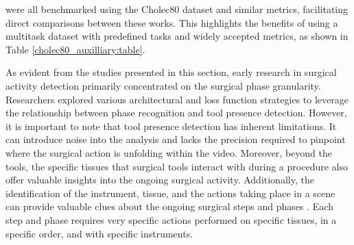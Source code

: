 \documentclass[times,twocolumn,final]{elsarticle}
\begin{document}
\citet{EndoNet,multi_task_recurrent_conv,multitask_connectionism,tecno,Sanchez-Matilla2022_data_centric} were all benchmarked using the Cholec80 dataset and similar metrics, facilitating direct comparisons between these works. This highlights the benefits of using a multitask dataset with predefined tasks and widely accepted metrics, as shown in Table \ref{cholec80_auxilliary:table}.

\begin{table}[htb!]
\caption{Phase recognition and instrument detection results of various multitask learning methods on Cholec80. Results are retrieved from references. The mean of the published results are reported.} \label{cholec80_auxilliary:table}
\end{table}

As evident from the studies presented in this section, early research in surgical activity detection primarily concentrated on the surgical phase granularity. Researchers explored various architectural and loss function strategies to leverage the relationship between phase recognition and tool presence detection. However, it is important to note that tool presence detection has inherent limitations. It can introduce noise into the analysis and lacks the precision required to pinpoint where the surgical action is unfolding within the video.
Moreover, beyond the tools, the specific tissues that surgical tools interact with during a procedure also offer valuable insights into the ongoing surgical activity. 
Additionally, the identification of the instrument, tissue, and the actions taking place in a scene can provide valuable clues about the ongoing surgical steps and phases \citep{holistic_scene_understanding}. 
Each step and phase requires very specific actions performed on specific tissues, in a specific order, and with specific instruments.   
\end{document}
